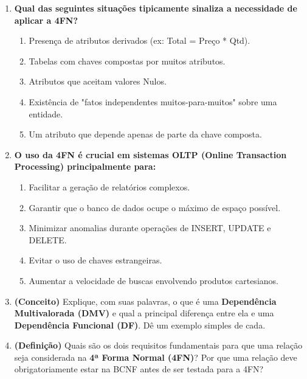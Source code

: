 \documentclass[12pt]{article}
\begin{document}
\begin{enumerate}[label=\textbf{Questão \arabic*:}, leftmargin=*]

  \item \textbf{Qual das seguintes situações tipicamente sinaliza a necessidade de aplicar a 4FN?}
  \begin{enumerate}[label=\alph*)]
    \item Presença de atributos derivados (ex: Total = Preço * Qtd).
    \item Tabelas com chaves compostas por muitos atributos.
    \item Atributos que aceitam valores Nulos.
    \item Existência de "fatos independentes muitos-para-muitos" sobre uma entidade.
    \item Um atributo que depende apenas de parte da chave composta.
  \end{enumerate}

  \item \textbf{O uso da 4FN é crucial em sistemas OLTP (Online Transaction Processing) principalmente para:}
  \begin{enumerate}[label=\alph*)]
    \item Facilitar a geração de relatórios complexos.
    \item Garantir que o banco de dados ocupe o máximo de espaço possível.
    \item Minimizar anomalias durante operações de INSERT, UPDATE e DELETE.
    \item Evitar o uso de chaves estrangeiras.
    \item Aumentar a velocidade de buscas envolvendo produtos cartesianos.
  \end{enumerate}

  \item \textbf{(Conceito)} Explique, com suas palavras, o que é uma \textbf{Dependência Multivalorada (DMV)} e qual a principal diferença entre ela e uma \textbf{Dependência Funcional (DF)}. Dê um exemplo simples de cada.
  \begin{resposta}
  \end{resposta}

  \vspace{0.4cm}

  \item \textbf{(Definição)} Quais são os dois requisitos fundamentais para que uma relação seja considerada na \textbf{4ª Forma Normal (4FN)}? Por que uma relação deve obrigatoriamente estar na BCNF antes de ser testada para a 4FN?
  \begin{resposta}
  \end{resposta}


\end{enumerate}
\end{document}
